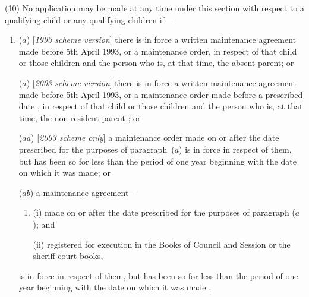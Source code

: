 \documentclass[12pt,a4paper]{article}
\begin{document}
%

(10) No application may be made at any time under this section with respect to a qualifying child or any qualifying children if—
\begin{enumerate}\item[]
($a$) [\emph{1993 scheme version}] there is in force a written maintenance agreement made before 5th April 1993, or a maintenance order, in respect of that child or those children and the person who is, at that time, the absent parent; or

($a$) [\emph{2003 scheme version}] there is in force a written maintenance agreement made before 5th April 1993, or a maintenance order
made before a prescribed date%
, in respect of that child or those children and the person who is, at that time, the 
non-resident parent%
; or

($aa$) [\emph{2003 scheme only}] a maintenance order made on or after the date prescribed for the purposes of paragraph~($a$)  is in force in respect of them, but has been so for less than the period of one year beginning with the date on which it was made; or

($ab$) a maintenance agreement—
\begin{enumerate}\item[]
(i) made on or after the date prescribed for the purposes of paragraph ($a$); and

(ii) registered for execution in the Books of Council and Session or the sheriff court books,
\end{enumerate}
is in force in respect of them, but has been so for less than the period of one year beginning with the date on which it was made%
%
.
\end{enumerate}
\end{document}
